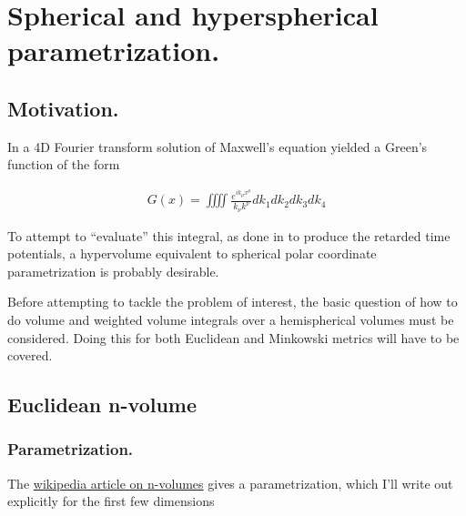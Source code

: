 \chapter{Spherical and hyperspherical parametrization.}
\label{chap:nvolume}
\date{Feb 26, 2009.  nvolume.tex}

\section{Motivation.}

In  a 4D Fourier transform solution of Maxwell's equation yielded a Green's function of the form

\begin{align*}
G(x) = \iiiint \frac{e^{i k_\mu x^\mu}}{k_\nu k^\nu} dk_1 dk_2 dk_3 dk_4
\end{align*}

To attempt to ``evaluate'' this integral, as done in
to produce the retarded time potentials,
a hypervolume equivalent to spherical polar coordinate
parametrization is probably desirable.

Before attempting to tackle the problem of interest, the basic question
of how to do volume and weighted volume integrals over a hemispherical volumes
must be considered.  Doing this for both Euclidean and Minkowski metrics will have to be covered.

\section{Euclidean n-volume }

\subsection{Parametrization. }

The \href{http://en.wikipedia.org/wiki/Hypersphere}{wikipedia article on n-volumes} gives a parametrization, which I'll write out explicitly for the first few dimensions

